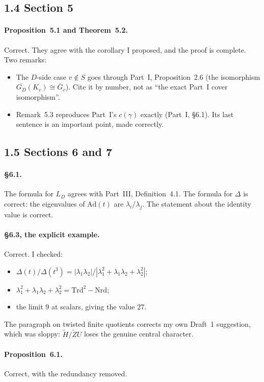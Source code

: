 \documentclass[11pt]{article}
\newcommand{\Gb}{\overline G}
\newcommand{\GDb}{\overline{G_D}}
\begin{document}
\subsection*{1.4 Section 5}
\paragraph{Proposition~5.1 and Theorem~5.2.} Correct. They agree with the
corollary I proposed, and the proof is complete. Two remarks:
\begin{itemize}
\item The $D$-side case $v\notin S$ goes through Part~I, Proposition~2.6
(the isomorphism $\GDb(K_v)\cong\Gb_v$). Cite it by number, not as ``the
exact Part~I cover isomorphism''.
\item Remark~5.3 reproduces Part~I's $c(\gamma)$ exactly (Part~I,
\S6.1). Its last sentence is an important point, made correctly.
\end{itemize}

\subsection*{1.5 Sections 6 and 7}
\paragraph{\S6.1.} The formula for $L_D$ agrees with Part~III,
Definition~4.1. The formula for $\Delta$ is correct: the eigenvalues of
$\mathrm{Ad}(t)$ are $\lambda_i/\lambda_j$. The statement about the
identity value is correct.

\paragraph{\S6.3, the explicit example.} Correct. I checked:
\begin{itemize}
\item $\Delta(t)/\Delta(t^3)=|\lambda_1\lambda_2|/|\lambda_1^2+\lambda_1\lambda_2+\lambda_2^2|$;
\item $\lambda_1^2+\lambda_1\lambda_2+\lambda_2^2=\mathrm{Trd}^2-\mathrm{Nrd}$;
\item the limit $9$ at scalars, giving the value $27$.
\end{itemize}
The paragraph on twisted finite quotients corrects my own Draft~1
suggestion, which was sloppy: $\tilde H/\tilde ZU$ loses the genuine
central character.

\paragraph{Proposition~6.1.} Correct, with the redundancy removed.
\end{document}
